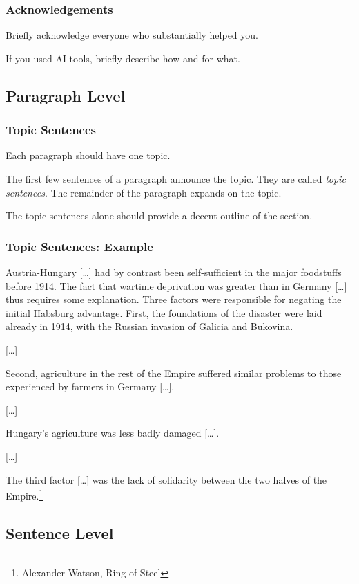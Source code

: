 \begin{frame}
  \frametitle{Acknowledgements}

  Briefly acknowledge everyone who substantially helped you.

  \medskip

  If you used AI tools, briefly describe how and for what.
\end{frame}

\subsection{Paragraph Level}

\begin{frame}
  \frametitle{Topic Sentences}

  Each paragraph should have one topic.

  \medskip

  The first few sentences of a paragraph announce the topic.
  They are called \emph{topic sentences}.
  The remainder of the paragraph expands on the topic.

  \medskip

  The topic sentences alone should provide a decent outline of the section.
\end{frame}

\begin{frame}
  \frametitle{Topic Sentences: Example}

  \small
  Austria-Hungary [\dots] had by contrast been self-sufficient in the major foodstuffs before 1914.
  The fact that wartime deprivation was greater than in Germany [\dots] thus requires some explanation.
  Three factors were responsible for negating the initial Habsburg advantage.
  First, the foundations of the disaster were laid already in 1914, with the Russian invasion of Galicia and Bukovina.

  [\dots]

  Second, agriculture in the rest of the Empire suffered similar problems to those experienced by farmers in Germany [\dots].

  [\dots]

  Hungary's agriculture was less badly damaged [\dots].

  [\dots]

  The third factor [\dots] was the lack of solidarity between the two halves of the Empire.\footnote{Alexander Watson, Ring of Steel}
\end{frame}

\subsection{Sentence Level}

